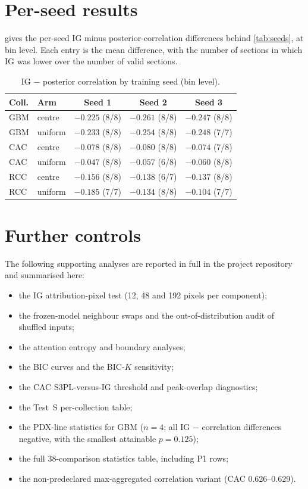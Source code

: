\section{Per-seed results}
\label{app:seeds}
 gives the per-seed IG minus posterior-correlation
differences behind \cref{tab:seeds}, at bin level. Each entry is the mean
difference, with the number of sections in which IG was lower over the number
of valid sections.

\begin{table}[h]
\caption{IG $-$ posterior correlation by training seed (bin level).}
\label{tab:perseed}
\centering\scriptsize
\begin{tabular}{@{}llccc@{}}
\toprule
Coll. & Arm & Seed 1 & Seed 2 & Seed 3 \\
\midrule
GBM & centre & $-0.225$ (8/8) & $-0.261$ (8/8) & $-0.247$ (8/8) \\
GBM & uniform & $-0.233$ (8/8) & $-0.254$ (8/8) & $-0.248$ (7/7) \\
CAC & centre & $-0.078$ (8/8) & $-0.080$ (8/8) & $-0.074$ (7/8) \\
CAC & uniform & $-0.047$ (8/8) & $-0.057$ (6/8) & $-0.060$ (8/8) \\
RCC & centre & $-0.156$ (8/8) & $-0.138$ (6/7) & $-0.137$ (8/8) \\
RCC & uniform & $-0.185$ (7/7) & $-0.134$ (8/8) & $-0.104$ (7/7) \\
\bottomrule
\end{tabular}
\end{table}

\section{Further controls}
\label{app:extra}
The following supporting analyses are reported in full in the project
repository and summarised here:
\begin{itemize}
  \item the IG attribution-pixel test (12, 48 and 192 pixels per component);
  \item the frozen-model neighbour swaps and the out-of-distribution audit of
        shuffled inputs;
  \item the attention entropy and boundary analyses;
  \item the BIC curves and the BIC-$K$ sensitivity;
  \item the CAC S3PL-versus-IG threshold and peak-overlap diagnostics;
  \item the Test~S per-collection table;
  \item the PDX-line statistics for GBM ($n=4$; all IG $-$ correlation
        differences negative, with the smallest attainable $p=0.125$);
  \item the full 38-comparison statistics table, including P1 rows;
  \item the non-predeclared max-aggregated correlation variant (CAC
        0.626--0.629).
\end{itemize}

